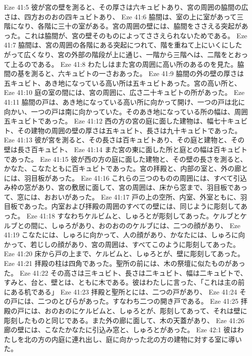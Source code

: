 Eze 41:5  彼が宮の壁を測ると、その厚さは六キュビトあり、宮の周囲の脇間の広さは、四方おのおの四キュビトあり、
Eze 41:6  脇間は、室の上に室があって三階になり、各階に三十の室がある。宮の周囲の壁には、脇間をささえる突起があった。これは脇間が、宮の壁そのものによってささえられないためである。
Eze 41:7  脇間は、宮の周囲の各階にある突起につれて、階を重ねて上にいくにしたがって広くなり、宮の外部の階段が上に通じ、一階から三階へは、二階をとおって上るのである。
Eze 41:8  わたしはまた宮の周囲に高い所のあるのを見た。脇間の基を測ると、六キュビトの一さおあった。
Eze 41:9  脇間の外の壁の厚さは五キュビト、あき地になっている高い所は五キュビトあった。宮の高い所と、
Eze 41:10  庭の室の間には、宮の周囲に、広さ二十キュビトの所があった。
Eze 41:11  脇間の戸は、あき地になっている高い所に向かって開け、一つの戸は北に向かい、一つの戸は南に向かっていた。そのあき地になっている所の幅は、周囲五キュビトであった。
Eze 41:12  西の方の宮の庭に面した建物は、幅七十キュビト、その建物の周囲の壁の厚さは五キュビト、長さは九十キュビトであった。
Eze 41:13  彼が宮を測ると、その長さは百キュビトあり、その庭と建物と、その壁は長さ百キュビト、
Eze 41:14  また宮の東に面した所と庭との幅は百キュビトであった。
Eze 41:15  彼が西の方の庭に面した建物と、その壁の長さを測ると、かなた、こなたともに百キュビトであった。宮の拝殿と、内部の室と、外の廊とには、羽目板があった。
Eze 41:16  これらの三つのものの周囲には、すべて引込み枠の窓があり、宮の敷居に面して、宮の周囲は、床から窓まで、羽目板であって、窓には、おおいがあった。
Eze 41:17  戸の上の空所、内室、外室ともに、羽目板であった。内室および拝殿の周囲のすべての壁には、同じように彫刻してあった。
Eze 41:18  すなわちケルビムと、しゅろとが彫刻してあった。ケルブとケルブとの間に、しゅろがあり、おのおののケルブには、二つの顔があり、
Eze 41:19  こなたには、しゅろに向かって、人の顔があり、かなたには、しゅろに向かって、若じしの顔があり、宮の周囲は、すべてこのように彫刻してあった。
Eze 41:20  床から戸の上まで、ケルビムと、しゅろとが、壁に彫刻してあった。
Eze 41:21  拝殿の柱は四角であった。聖所の前には、木の祭壇に似たものがあった。
Eze 41:22  その高さは三キュビト、長さは二キュビト、幅は二キュビトで、すみと、台と、壁とは、ともに木である。彼はわたしに言った、「これは主の前にある机である」
Eze 41:23  拝殿と聖所とには、二つの戸があり、
Eze 41:24  その戸には、二つのとびらがあった。すなわち二つの開き戸である。
Eze 41:25  拝殿の戸には、おのおのにケルビムと、しゅろとが、彫刻してあって、それは壁に彫刻したものと同じである。また外の廊に面して、木の天蓋があり、
Eze 41:26  廊の壁には、こなたかなたに引込み窓と、しゅろとがあった。
Eze 42:1  彼はわたしを北の方の内庭に連れ出し、庭に向かった北の方の建物に対する室に導いた。
